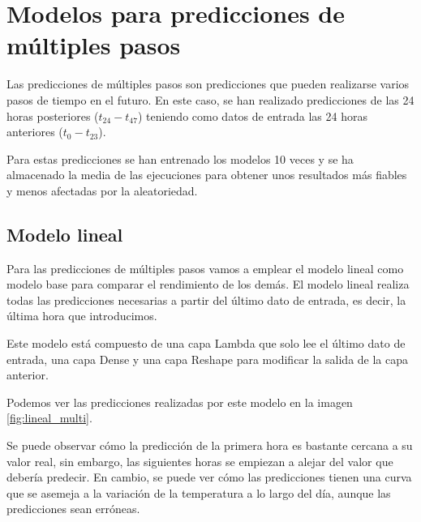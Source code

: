 \section{Modelos para predicciones de múltiples pasos}

Las predicciones de múltiples pasos son predicciones que pueden realizarse varios pasos de tiempo en el futuro. En este caso, se han realizado predicciones de las 24 horas posteriores ($t_{24}-t_{47}$) teniendo como datos de entrada las 24 horas anteriores ($t_0-t_{23}$).

\par

Para estas predicciones se han entrenado los modelos 10 veces y se ha almacenado la media de las ejecuciones para obtener unos resultados más fiables y menos afectadas por la aleatoriedad.


\subsection{Modelo lineal}

Para las predicciones de múltiples pasos vamos a emplear el modelo lineal como modelo base para comparar el rendimiento de los demás. El modelo lineal realiza todas las predicciones necesarias a partir del último dato de entrada, es decir, la última hora que introducimos.

\par

Este modelo está compuesto de una capa Lambda que solo lee el último dato de entrada, una capa Dense y una capa Reshape para modificar la salida de la capa anterior.


\par

Podemos ver las predicciones realizadas por este modelo en la imagen \ref{fig:lineal_multi}.


Se puede observar cómo la predicción de la primera hora es bastante cercana a su valor real, sin embargo, las siguientes horas se empiezan a alejar del valor que debería predecir. En cambio, se puede ver cómo las predicciones tienen una curva que se asemeja a la variación de la temperatura a lo largo del día, aunque las predicciones sean erróneas.

